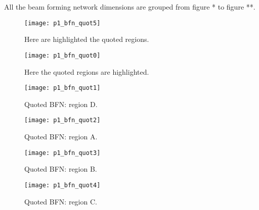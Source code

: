 All the beam forming network dimensions are grouped from figure * to figure **.
\begin{figure}[t] 
	\centering
	\texttt{[image: p1\_bfn\_quot5]}
	\caption{Here are highlighted the quoted regions. }
	\label{fig:p1_bfn_quot5}
\end{figure}
\newpage 
\begin{figure}[H] 
	\centering
	\texttt{[image: p1\_bfn\_quot0]}
	\caption{Here the quoted regions are highlighted. }
	\label{fig:p1_bfn_quot0}
\end{figure}

\begin{figure}[H] 
	\centering
	\texttt{[image: p1\_bfn\_quot1]}
	\caption{Quoted BFN: region D. }
	\label{fig:p1_bfn_quot1}
\end{figure}

\begin{figure}[H] 
	\centering
	\texttt{[image: p1\_bfn\_quot2]}
	\caption{Quoted BFN: region A. }
	\label{fig:p1_bfn_quot2}
\end{figure}

\begin{figure}[H] 
	\centering
	\texttt{[image: p1\_bfn\_quot3]}
	\caption{Quoted BFN: region B. }
	\label{fig:p1_bfn_quot3}
\end{figure}

\begin{figure}[H] 
	\centering
	\texttt{[image: p1\_bfn\_quot4]}
	\caption{Quoted BFN: region C. }
	\label{fig:p1_bfn_quot4}
\end{figure}

